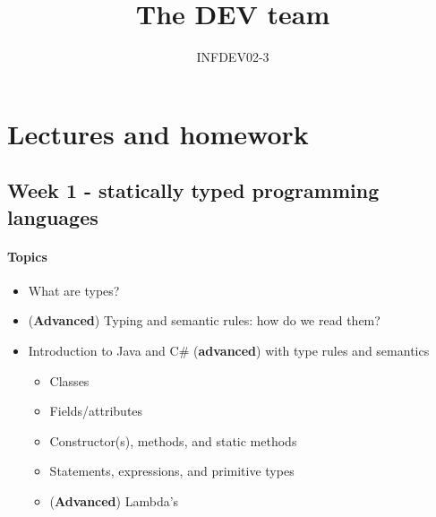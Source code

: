 \documentclass[12pt,a4paper,draft]{article}
\author{INFDEV02-3}
\title{The DEV team}
\begin{document}
	\maketitle
	
	\section{Lectures and homework}
	
		\subsection{Week 1 - statically typed programming languages}
		
			\paragraph*{Topics}
			
				\begin{itemize}
					\item What are types?
					\item (\textbf{Advanced}) Typing and semantic rules: how do we read them?
					\item Introduction to Java and C\# (\textbf{advanced}) with type rules and semantics
					\begin{itemize}
						\item Classes
						\item Fields/attributes
						\item Constructor(s), methods, and static methods
						\item Statements, expressions, and primitive types
						\item (\textbf{Advanced}) Lambda's
					\end{itemize}
				\end{itemize}
				
\end{document}
